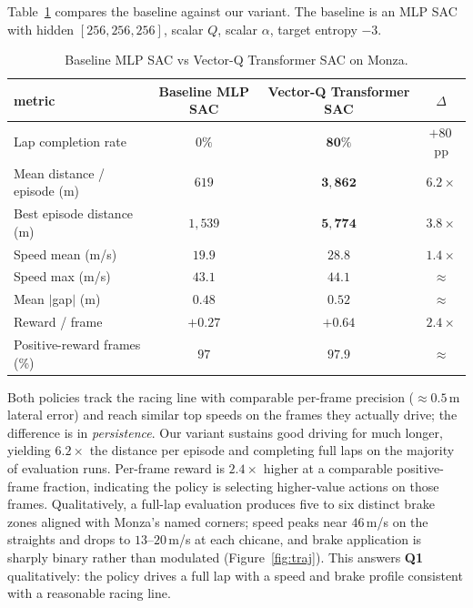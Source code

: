 \documentclass{article}
\begin{document}
Table~\ref{tab:main} compares the baseline against our variant. The
baseline is an MLP SAC with hidden $[256, 256, 256]$, scalar $Q$,
scalar $\alpha$, target entropy $-3$.

\begin{table}[h]
\centering
\footnotesize
\caption{Baseline MLP SAC vs Vector-Q Transformer SAC on Monza.}
\label{tab:main}
\begin{tabular}{@{}lccc@{}}
\toprule
metric & Baseline MLP SAC & Vector-Q Transformer SAC & $\Delta$ \\
\midrule
Lap completion rate                    & $0\%$        & $\mathbf{80\%}$         & $+80$\,pp \\
Mean distance / episode (m)            & $619$        & $\mathbf{3{,}862}$      & $6.2\times$ \\
Best episode distance (m)              & $1{,}539$    & $\mathbf{5{,}774}$      & $3.8\times$ \\
Speed mean (m/s)                       & $19.9$       & $\mathbf{28.8}$         & $1.4\times$ \\
Speed max (m/s)                        & $43.1$       & $44.1$                  & $\approx$ \\
Mean $|$gap$|$ (m)                     & $0.48$       & $0.52$                  & $\approx$ \\
Reward / frame                         & $+0.27$      & $\mathbf{+0.64}$        & $2.4\times$ \\
Positive-reward frames (\%)            & $97$         & $97.9$                  & $\approx$ \\
\bottomrule
\end{tabular}
\end{table}

Both policies track the racing line with comparable per-frame
precision ($\approx 0.5$\,m lateral error) and reach similar top
speeds on the frames they actually drive; the difference is in
\emph{persistence}. Our variant sustains good driving for much
longer, yielding $6.2\times$ the distance per episode and completing
full laps on the majority of evaluation runs. Per-frame reward is
$2.4\times$
higher at a comparable positive-frame fraction, indicating the
policy is selecting higher-value actions on those frames.
Qualitatively, a full-lap evaluation produces five to six distinct
brake zones aligned with Monza's named corners; speed peaks near
$46$\,m/s on the straights and drops to $13$--$20$\,m/s at each
chicane, and brake application is sharply binary rather than
modulated (Figure~\ref{fig:traj}). This answers \textbf{Q1}
qualitatively: the policy drives a full lap with a speed and brake
profile consistent with a reasonable racing line.
\end{document}
